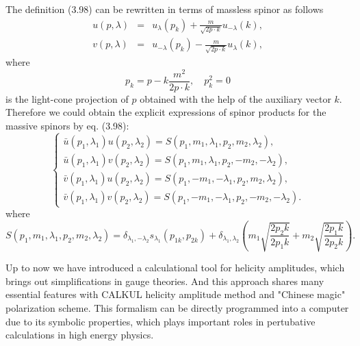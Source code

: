 The definition (3.98) can be rewritten in terms of massless spinor as follows
\begin{eqnarray}
u(p,\lambda)&=&u_\lambda(p_k)+\frac{m}{\sqrt{2p\cdot k}}u_{-\lambda}(k),\nonumber\\
v(p,\lambda)&=&u_{-\lambda}(p_k)-\frac{m}{\sqrt{2p\cdot k}}u_\lambda(k),
\end{eqnarray}
where
\begin{equation}
p_k=p-k\frac{m^2}{2p\cdot k}, \quad p^2_k=0
\end{equation}
is the light-cone projection of $p$ obtained with the help of the auxiliary vector $k$. Therefore we could obtain the explicit expressions of spinor products for the massive spinors by eq. (3.98):
\begin{equation}
\begin{cases}
\bar{u}(p_1,\lambda_1)u(p_2,\lambda_2)=S(p_1,m_1,\lambda_1,p_2,m_2,\lambda_2),\\
\bar{u}(p_1,\lambda_1)v(p_2,\lambda_2)=S(p_1,m_1,\lambda_1,p_2,-m_2,-\lambda_2),\\
\bar{v}(p_1,\lambda_1)u(p_2,\lambda_2)=S(p_1,-m_1,-\lambda_1,p_2,m_2,\lambda_2),\\
\bar{v}(p_1,\lambda_1)v(p_2,\lambda_2)=S(p_1,-m_1,-\lambda_1,p_2,-m_2,-\lambda_2).
\end{cases}
\end{equation}
where
\begin{equation}
S(p_1,m_1,\lambda_1,p_2,m_2,\lambda_2)=\delta_{\lambda_1,-\lambda_2}s_{\lambda_1}(p_{1k},p_{2k})+\delta_{\lambda_1,\lambda_2}\left(m_1\sqrt{\frac{2p_2k}{2p_1k}}+m_2\sqrt{\frac{2p_1k}{2p_2k}} \right).
\end{equation}

Up to now we have introduced a calculational tool for helicity amplitudes, which brings out simplifications in gauge theories. 
And this approach shares many essential features with CALKUL helicity amplitude  method and "Chinese magic" polarization scheme. This formalism can be directly programmed into a computer due to its symbolic properties, which plays important roles in pertubative calculations in high energy physics.